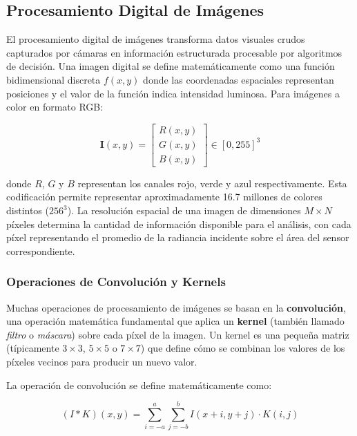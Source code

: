 \subsection{Procesamiento Digital de Imágenes}

El procesamiento digital de imágenes transforma datos visuales crudos capturados por cámaras en información estructurada procesable por algoritmos de decisión. Una imagen digital se define matemáticamente como una función bidimensional discreta $f(x,y)$ donde las coordenadas espaciales representan posiciones y el valor de la función indica intensidad luminosa. Para imágenes a color en formato RGB:

\begin{equation}
\mathbf{I}(x,y) = \begin{bmatrix} R(x,y) \\ G(x,y) \\ B(x,y) \end{bmatrix} \in [0, 255]^3
\end{equation}

donde $R$, $G$ y $B$ representan los canales rojo, verde y azul respectivamente. Esta codificación permite representar aproximadamente 16.7 millones de colores distintos ($256^3$). La resolución espacial de una imagen de dimensiones $M \times N$ píxeles determina la cantidad de información disponible para el análisis, con cada píxel representando el promedio de la radiancia incidente sobre el área del sensor correspondiente.

\subsubsection{Operaciones de Convolución y Kernels}

Muchas operaciones de procesamiento de imágenes se basan en la \textbf{convolución}, una operación matemática fundamental que aplica un \textbf{kernel} (también llamado \textit{filtro} o \textit{máscara}) sobre cada píxel de la imagen. Un kernel es una pequeña matriz (típicamente $3 \times 3$, $5 \times 5$ o $7 \times 7$) que define cómo se combinan los valores de los píxeles vecinos para producir un nuevo valor.

La operación de convolución se define matemáticamente como:

\begin{equation}
(I \ast K)(x,y) = \sum_{i=-a}^{a} \sum_{j=-b}^{b} I(x+i, y+j) \cdot K(i,j)
\end{equation}

